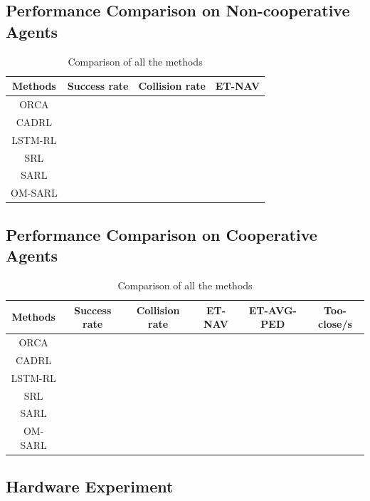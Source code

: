 \documentclass[letterpaper, 10 pt, conference]{ieeeconf}  %
\begin{document}
\subsection{Performance Comparison on Non-cooperative Agents}

\begin{table}[h]
\caption{Comparison of all the methods}
\label{table_example}
\begin{center}
\begin{tabular}{|c||c|c|c|}
\hline
Methods & Success rate & Collision rate & ET-NAV\\
\hline
ORCA &  &  &\\
\hline
CADRL &  &  &\\
\hline
LSTM-RL &  &  &\\
\hline
SRL &  &  &\\
\hline
SARL &  &  &\\
\hline
OM-SARL &  &  &\\
\hline
\end{tabular}
\end{center}
\end{table}

\subsection{Performance Comparison on Cooperative Agents}

\begin{table}[h]
\caption{Comparison of all the methods}
\label{table_example}
\begin{center}
\begin{tabular}{|c||c|c|c|c|c|}
\hline
Methods & Success rate & Collision rate & ET-NAV & ET-AVG-PED & Too-close/s\\
\hline
ORCA &  &  & & & \\
\hline
CADRL &  &  & &  &\\
\hline
LSTM-RL &  &  & & &\\
\hline
SRL &  &  & & &\\
\hline
SARL &  & & & &\\
\hline
OM-SARL  &  & & & &\\
\hline
\end{tabular}
\end{center}
\end{table}

\subsection{Hardware Experiment}
\end{document}
